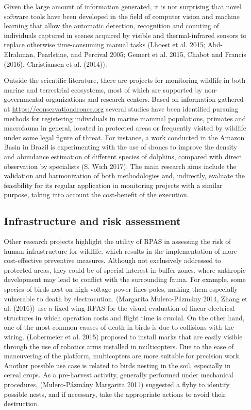 \documentclass[]{interact}
\theoremstyle{plain}%
\theoremstyle{definition}
\theoremstyle{remark}
\begin{document}
Given the large amount of information generated, it is not surprising
that novel software tools have been developed in the field of computer
vision and machine learning that allow the automatic detection,
recognition and counting of individuals captured in scenes acquired by
visible and thermal-infrared sensors to replace otherwise time-consuming
manual tasks (Lhoest et al. 2015; Abd-Elrahman, Pearlstine, and Percival
2005; Gemert et al. 2015, Chabot and Francis (2016), Christiansen et al.
(2014)).

Outside the scientific literature, there are projects for monitoring
wildlife in both marine and terrestrial ecosystems, most of which are
supported by non-governmental organizations and research centers. Based
on information gathered at \url{https://conservationdrones.org} several
studies have been identified pursuing methods for registering
individuals in marine mammal populations, primates and macrofauna in
general, located in protected areas or frequently visited by wildlife
under some legal figure of threat. For instance, a work conducted in the
Amazon Basin in Brazil is experimenting with the use of drones to
improve the density and abundance estimation of different species of
dolphins, compared with direct observation by specialists (S. Wich
2017). The main research aims include the validation and harmonization
of both methodologies and, indirectly, evaluate the feasibility for its
regular application in monitoring projects with a similar purpose,
taking into account the cost-benefit of the execution.



\subsection{Infrastructure and risk
assessment}\label{infrastructure-and-risk-assessment}

Other research projects highlight the utility of RPAS in assessing the
risk of human infrastructure for wildlife, which results in the
implementation of more cost-effective preventive measures. Although not
exclusively addressed to protected areas, they could be of special
interest in buffer zones, where anthropic development may lead to
conflict with the surrounding fauna. For example, some species of birds
nest on high voltage power lines poles, making them especially
vulnerable to death by electrocution. (Margarita Mulero-Pázmány 2014,
Zhang et al. (2016)) use a fixed-wing RPAS for the visual evaluation of
linear electrical structures in which operation costs and flight time is
crucial. On the other hand, one of the most common causes of death in
birds is due to collisions with the wiring. (Lobermeier et al. 2015)
proposed to install marks that are easily visible through the use of
robotics arms installed in multicopters. Due to the ease of maneuvering
of the platform, multicopters are more suitable for precision work.
Another possible use case is related to birds nesting in the soil,
especially in cereal crops. As a pre-harvest activity, generally
performed under mechanical procedures, (Mulero-Pázmány Margarita 2011)
suggested a flyby to identify possible nests, and if necessary, take the
appropriate actions to avoid their destruction.
\end{document}
